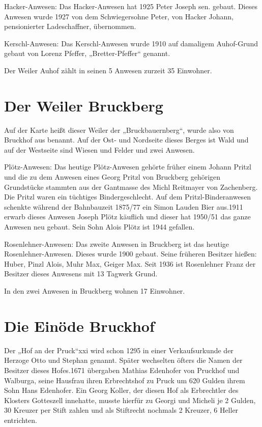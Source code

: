 \documentclass[12pt,a4pager]{book}
\begin{document}
Hacker-Anwesen: Das Hacker-Anwesen hat 1925 Peter Joseph sen. gebaut. Dieses
Anwesen wurde 1927 von dem Schwiegersohne Peter, von Hacker Johann,
pensionierter Ladeschaffner, übernommen.

Kerschl-Anwesen: Das Kerschl-Anwesen wurde 1910 auf damaligem Auhof-Grund gebaut
von Lorenz Pfeffer, „Bretter-Pfeffer“ genannt.

Der Weiler Auhof zählt in seinen 5 Anwesen zurzeit 35 Einwohner.

\section{Der Weiler Bruckberg}

Auf der Karte heißt dieser Weiler der „Bruckbauernberg“, wurde also von Bruckhof
aus benannt. Auf der Ost- und Nordseite dieses Berges ist Wald und auf der
Westseite sind Wiesen und Felder und zwei Anwesen.

Plötz-Anwesen: Das heutige Plötz-Anwesen gehörte früher einem Johann Pritzl und
die zu dem Anwesen eines Georg Pritzl von Bruckberg gehörigen Grundstücke
stammten aus der Gantmasse des Michl Reitmayer von Zachenberg. Die Pritzl waren
ein tüchtiges Bindergeschlecht. Auf dem Pritzl-Binderanwesen schenkte während
der Bahnbauzeit 1875/77 ein Simon Lauden Bier aus.1911 erwarb dieses Anwesen
Joseph Plötz käuflich und dieser hat 1950/51 das ganze Anwesen neu gebaut. Sein
Sohn Alois Plötz ist 1944 gefallen.

Rosenlehner-Anwesen: Das zweite Anwesen in Bruckberg ist das heutige
Rosenlehner-Anwesen. Dieses wurde 1900 gebaut. Seine früheren Besitzer hießen:
Huber, Pinzl Alois, Muhr Max, Geiger Max. Seit 1936 ist Rosenlehner Franz der
Besitzer dieses Anwesens mit 13 Tagwerk Grund.

In den zwei Anwesen in Bruckberg wohnen 17 Einwohner.

\section{Die Einöde Bruckhof}

Der „Hof an der Pruck“xxi wird schon 1295 in einer Verkaufsurkunde der Herzoge
Otto und Stephan genannt. Später wechselten öfters die Namen der Besitzer dieses
Hofes.1671 übergaben Mathias Edenhofer von Pruckhof und Walburga, seine Hausfrau
ihren Erbrechtshof zu Pruck um 620 Gulden ihrem Sohn Hans Edenhofer. Ein Georg
Koller, der diesen Hof als Erbrechtler des Klosters Gotteszell innehatte, musste
hierfür zu Georgi und Micheli je 2 Gulden, 30 Kreuzer per Stift zahlen und als
Stiftrecht nochmals 2 Kreuzer, 6 Heller entrichten.
\end{document}
